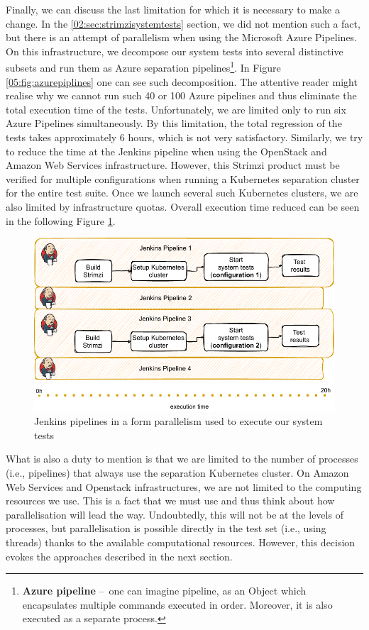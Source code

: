 Finally, we can discuss the last limitation for which it is necessary to make a change. In the \ref{02:sec:strimzisystemtests} section, we did not mention such a fact, but there is an attempt of parallelism when using the Microsoft Azure Pipelines. On this infrastructure, we decompose our system tests into several distinctive subsets and run them as Azure separation pipelines\footnote{\textbf{Azure pipeline} \---\ one can imagine pipeline, as an Object which encapsulates multiple commands executed in order. Moreover, it is also executed as a separate process.}. In Figure \ref{05:fig:azurepiplines} one can see such decomposition. The attentive reader might realise why we cannot run such 40 or 100 Azure pipelines and thus eliminate the total execution time of the tests. Unfortunately, we are limited only to run six Azure Pipelines simultaneously. By this limitation, the total regression of the tests takes approximately 6 hours, which is not very satisfactory. Similarly, we try to reduce the time at the Jenkins pipeline when using the OpenStack and Amazon Web Services infrastructure. However, this Strimzi product must be verified for multiple configurations when running a Kubernetes separation cluster for the entire test suite. Once we launch several such Kubernetes clusters, we are also limited by infrastructure quotas. Overall execution time reduced can be seen in the following Figure \ref{05:fig:jenkinspipelines}.
\begin{figure}[!ht]
    \centering
    \includegraphics[scale=1]{obrazky-figures/06-proposal-of-parallel-approach/02-jenkins-smaller.pdf}
    \caption{Jenkins pipelines in a form parallelism used to execute our system tests}
    \label{05:fig:jenkinspipelines}
\end{figure}

What is also a duty to mention is that we are limited to the number of processes (i.e., pipelines) that always use the separation Kubernetes cluster. On Amazon Web Services and Openstack infrastructures, we are not limited to the computing resources we use. This is a fact that we must use and thus think about how parallelisation will lead the way. Undoubtedly, this will not be at the levels of processes, but parallelisation is possible directly in the test set (i.e., using threads) thanks to the available computational resources. However, this decision evokes the approaches described in the next section.

